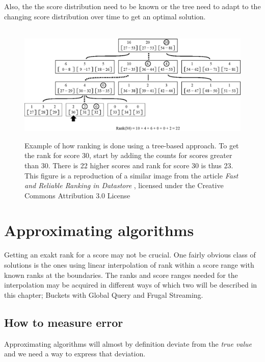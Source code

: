 Also, the the score distribution need to be known or the tree need to adapt to the changing score distribution over time to get an optimal solution.

\begin{figure}[h!]
  \centering
  \caption{Example of how ranking is done using a tree-based approach. To get the rank for score 30, start by adding the counts for scores greater than 30. There is 22 higher scores and rank for score 30 is thus 23.\\This figure is a reproduction of a similar image from the article \emph{Fast and Reliable Ranking in Datastore} \cite{ranking-in-datastore} 
 , licensed under the Creative Commons Attribution 3.0 License}   \label{fig:tree}
\hbox{\hspace{-0.8cm}
  \includegraphics[width=15cm]{img/tree.eps}}
\end{figure}


\section{Approximating algorithms}

Getting an exakt rank for a score may not be crucial. One fairly obvious class of solutions is the ones using linear interpolation of rank within a score range with known ranks at the boundaries. The ranks and score ranges needed for the interpolation may be acquired in different ways of which two will be described in this chapter; Buckets with Global Query and Frugal Streaming.

\subsection{How to measure error}

Approximating algorithms will almost by definition deviate from the \emph{true value} and we need a way to express that deviation.

